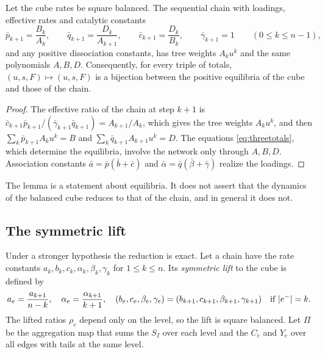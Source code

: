 \begin{lemma}[Compression]\label{lem:compression}
Let the cube rates be square balanced. The sequential chain with loadings, effective rates and
catalytic constants
\[
 \bar p_{k+1}=\frac{B_k}{A_k},\qquad \bar q_{k+1}=\frac{D_k}{A_{k+1}},\qquad
 \bar c_{k+1}=\frac{D_k}{B_k},\qquad \bar\gamma_{k+1}=1\qquad(0\le k\le n-1),
\]
and any positive dissociation constants, has tree weights \(A_ku^k\) and the same polynomials
\(A,B,D\). Consequently, for every triple of totals, \((u,s,F)\mapsto(u,s,F)\) is a bijection
between the positive equilibria of the cube and those of the chain.
\end{lemma}
\begin{proof}
The effective ratio of the chain at step \(k+1\) is
\(\bar c_{k+1}\bar p_{k+1}/(\bar\gamma_{k+1}\bar q_{k+1})=A_{k+1}/A_k\), which gives the tree
weights \(A_ku^k\), and then \(\sum_k\bar p_{k+1}A_ku^k=B\) and
\(\sum_k\bar q_{k+1}A_{k+1}u^{k}=D\). The equations \eqref{eq:threetotals}, which determine the
equilibria, involve the network only through \(A,B,D\). Association constants
\(\bar a=\bar p(\bar b+\bar c)\) and \(\bar\alpha=\bar q(\bar\beta+\bar\gamma)\) realize the
loadings.
\end{proof}
The lemma is a statement about equilibria. It does not assert that the dynamics of the
balanced cube reduces to that of the chain, and in general it does not.

\subsection{The symmetric lift}
Under a stronger hypothesis the reduction is exact. Let a chain have the rate
constants \(a_k,b_k,c_k,\alpha_k,\beta_k,\gamma_k\) for \(1\le k\le n\). Its \emph{symmetric
lift} to the cube is defined by
\begin{equation}\label{eq:lift}
 a_e=\frac{a_{k+1}}{n-k},\quad \alpha_e=\frac{\alpha_{k+1}}{k+1},\quad
 (b_e,c_e,\beta_e,\gamma_e)=(b_{k+1},c_{k+1},\beta_{k+1},\gamma_{k+1})
 \quad\text{if }|e^{-}|=k .
\end{equation}
The lifted ratios \(\rho_e\) depend only on the level, so the lift is square balanced. Let
\(\Pi\) be the aggregation map that sums the \(S_I\) over each level and the \(C_e\) and
\(Y_e\) over all edges with tails at the same level.

